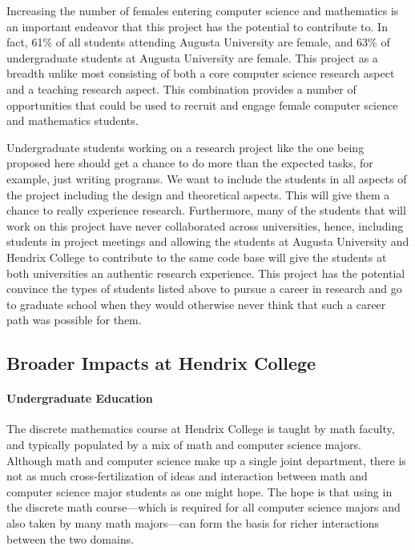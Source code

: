 Increasing the number of females entering computer science and
mathematics is an important endeavor that this project has the
potential to contribute to.  In fact, 61\% of all students attending
Augusta University are female, and 63\% of undergraduate students at
Augusta University are female.  This project as a breadth unlike most
consisting of both a core computer science research aspect and a
teaching research aspect.  This combination provides a number of
opportunities that could be used to recruit and engage female computer
science and mathematics students.

Undergraduate students working on a research project like the one
being proposed here should get a chance to do more than the expected
tasks, for example, just writing programs.  We want to include the
students in all aspects of the project including the design and
theoretical aspects.  This will give them a chance to really
experience research.  Furthermore, many of the students that will work
on this project have never collaborated across universities, hence,
including students in project meetings and allowing the students at
Augusta University and Hendrix College to contribute to the same code
base will give the students at both universities an authentic research
experience.  This project has the potential convince the types of
students listed above to pursue a career in research and go to
graduate school when they would otherwise never think that such a
career path was possible for them.

\subsection{Broader Impacts at Hendrix College}
\label{subsec:broader_impacts_at_hendrix_college}

\paragraph{Undergraduate Education}  The discrete mathematics course at Hendrix
College is taught by math faculty, and typically populated by a mix of
math and computer science majors.  Although math and computer science
make up a single joint department, there is not as much
cross-fertilization of ideas and interaction between math and computer
science major students as one might hope.  The hope is that
using \thelang in the discrete math course---which is required for all
computer science majors and also taken by many math majors---can form
the basis for richer interactions between the two domains.

